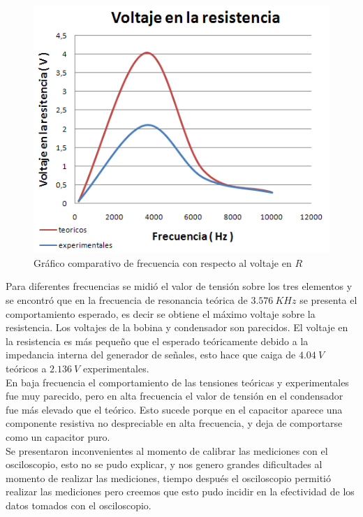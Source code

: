 \documentclass[twocolumn]{IEEEtran}
\begin{document}
\noindent
\begin{figure}[H]
	\centering
		\includegraphics[scale=0.6]{vrvsfr.png}
	\caption{Gráfico comparativo de frecuencia con respecto al voltaje en $R$}
	\label{teo5}
\end{figure}
\noindent
Para diferentes frecuencias se midió el valor de tensión sobre los tres elementos y se encontró
que en la frecuencia de resonancia teórica de $3.576\ KHz$ se presenta el comportamiento
esperado, es decir se obtiene el máximo voltaje sobre la resistencia. Los voltajes de la bobina
y condensador son parecidos. El voltaje en la resistencia es más pequeño que el esperado
teóricamente debido a la impedancia interna del generador de señales, esto hace que caiga de
$4.04\ V$ teóricos a $2.136\ V$ experimentales.\\
En baja frecuencia el comportamiento de las tensiones teóricas y experimentales fue muy
parecido, pero en alta frecuencia el valor de tensión en el condensador fue más elevado
que el teórico. Esto sucede porque en el capacitor aparece una componente resistiva no
despreciable en alta frecuencia, y deja de comportarse como un capacitor puro.\\
Se presentaron inconvenientes al momento de calibrar las mediciones con el osciloscopio, esto
no se pudo explicar, y nos genero grandes dificultades al momento de realizar las mediciones,
tiempo después el osciloscopio permitió realizar las mediciones pero creemos que esto pudo
incidir en la efectividad de los datos tomados con el osciloscopio.
\end{document}
